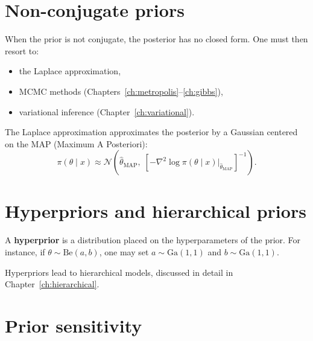 \section{Non-conjugate priors}

\begin{remark}
When the prior is not conjugate, the posterior has no closed form. One
must then resort to:
\begin{itemize}
  \item the Laplace approximation,
  \item MCMC methods (Chapters~\ref{ch:metropolis}--\ref{ch:gibbs}),
  \item variational inference (Chapter~\ref{ch:variational}).
\end{itemize}
\end{remark}

\begin{definition}
The Laplace approximation approximates the posterior by a Gaussian
centered on the MAP (Maximum A Posteriori):
\[
  \pi(\theta \mid x) \approx \mathcal{N}\!\left(\hat{\theta}_{\text{MAP}},\;
  \left[-\nabla^2 \log \pi(\theta \mid x)\big|_{\hat{\theta}_{\text{MAP}}}\right]^{-1}\right).
\]
\end{definition}

\section{Hyperpriors and hierarchical priors}

\begin{definition}[Hyperprior]
A \textbf{hyperprior} is a distribution placed on the hyperparameters
of the prior. For instance, if $\theta \sim \text{Be}(a, b)$, one may
set $a \sim \text{Ga}(1, 1)$ and $b \sim \text{Ga}(1, 1)$.
\end{definition}

\begin{remark}
Hyperpriors lead to hierarchical models, discussed in detail in
Chapter~\ref{ch:hierarchical}.
\end{remark}

\section{Prior sensitivity}

